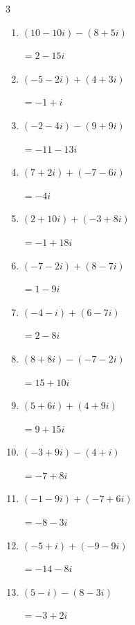 \begin{multicols}{3}
\begin{enumerate}
        $\displaystyle =6+12i$

  \item $\displaystyle (10-10i) - (8+5i)$

        $\displaystyle =2-15i$

  \item $\displaystyle (-5-2i) + (4+3i)$

        $\displaystyle =-1+i$

  \item $\displaystyle (-2-4i) - (9+9i)$

        $\displaystyle =-11-13i$

  \item $\displaystyle (7+2i) + (-7-6i)$

        $\displaystyle =-4i$

\columnbreak %

  \item $\displaystyle (2+10i) + (-3+8i)$

        $\displaystyle =-1+18i$

  \item $\displaystyle (-7-2i) + (8-7i)$

        $\displaystyle =1-9i$

  \item $\displaystyle (-4-i) + (6-7i)$

        $\displaystyle =2-8i$

  \item $\displaystyle (8+8i) - (-7-2i)$

        $\displaystyle =15+10i$

  \item $\displaystyle (5+6i) + (4+9i)$

        $\displaystyle =9+15i$

  \item $\displaystyle (-3+9i) - (4+i)$

        $\displaystyle =-7+8i$

  \item $\displaystyle (-1-9i) + (-7+6i)$

        $\displaystyle =-8-3i$

  \item $\displaystyle (-5+i) + (-9-9i)$

        $\displaystyle =-14-8i$

  \item $\displaystyle (5-i) - (8-3i)$

        $\displaystyle =-3+2i$


\end{enumerate}
\end{multicols}
